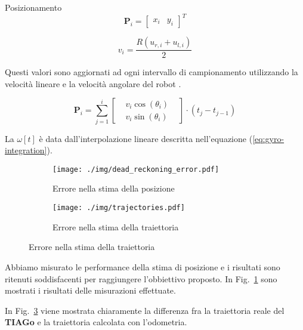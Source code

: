 \documentclass[10pt]{beamer}
\begin{document}
\begin{frame}[allowframebreaks]{Posizionamento}
		\begin{equation}\label{eq:position-vector}
			\textbf{P}_i = \begin{bmatrix}
				  x_i & y_i  
			\end{bmatrix}^T
		\end{equation}
		
		\begin{equation}\label{eq:linear-velocity}
			v_i = \frac{R (u_{r,i}+u_{l,i})}{2}
		\end{equation}
		
		Questi valori sono aggiornati ad ogni intervallo di campionamento utilizzando la velocità lineare e la velocità angolare del robot \cite{572228}.
		
		\begin{equation}\label{eq:position-vector-update}
			\textbf{P}_i = \sum_{j = 1}^{i} \begin{bmatrix}
				 & v_i\cos(\theta_i ) & \\
				 & v_i\sin(\theta_i )
			\end{bmatrix}\cdot (t_j-t_{j-1}) 
		\end{equation}
		
		La $\omega [t]$ è data dall'interpolazione lineare descritta nell'equazione (\ref{eq:gyro-integration}).
		
		
		
	\end{frame}
	\begin{frame}
		\begin{figure}[H]
			\begin{subfigure}{0.49\textwidth}
				\centering
				\texttt{[image: ./img/dead\_reckoning\_error.pdf]}
				\caption{Errore nella stima della posizione}
				\label{fig:dead_reckoning_error}
			\end{subfigure}
			\begin{subfigure}{0.49\textwidth}
				\centering
				\texttt{[image: ./img/trajectories.pdf]}
				\caption{Errore nella stima della traiettoria}
				\label{fig:trajectory_error}
			\end{subfigure}
		\end{figure}

		Abbiamo misurato le performance della stima di posizione e i risultati
		sono ritenuti soddisfacenti per raggiungere l'obbiettivo proposto. In
		Fig.~\ref{fig:dead_reckoning_error} sono mostrati i risultati delle
		misurazioni effettuate.

		In Fig.~\ref{fig:trajectory_error} viene mostrata chiaramente la
		differenza fra la traiettoria reale del \textbf{TIAGo} e la traiettoria
		calcolata con l'odometria.  
	\end{frame}
	
\end{document}

